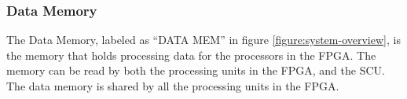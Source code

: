 \subsubsection{Data Memory}

The Data Memory, labeled as ``DATA MEM'' in figure \vref{figure:system-overview}, is the memory that holds processing data for the processors in the \gls{FPGA}.
The memory can be read by both the processing units in the \gls{FPGA}, and the \gls{SCU}.
The data memory is shared by all the processing units in the \gls{FPGA}.

